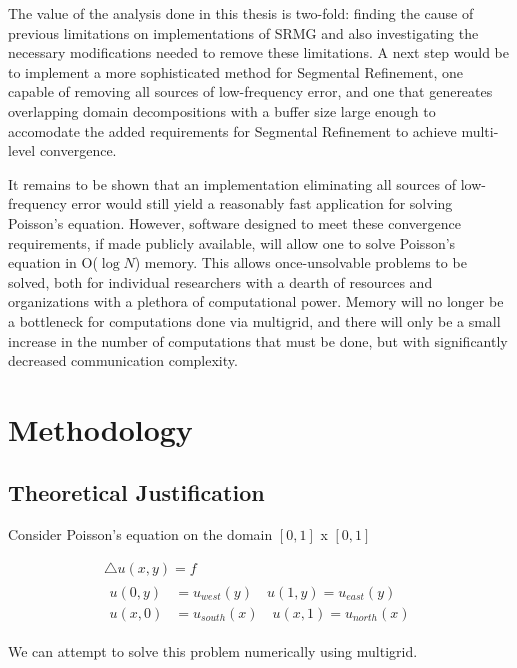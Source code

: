 \documentclass[final]{siamart1116}
\numberwithin{theorem}{section}
\begin{document}
    
    The value of the analysis done in this thesis is two-fold: finding the cause of previous limitations on implementations of SRMG and also investigating the necessary modifications needed to remove these limitations. A next step would be to implement a more sophisticated method for Segmental Refinement, one capable of removing all sources of low-frequency error, and one that genereates overlapping domain decompositions with a buffer size large enough to accomodate the added requirements for Segmental Refinement to achieve multi-level convergence.  
    
    It remains to be shown that an implementation eliminating all sources of low-frequency error would still yield a reasonably fast application for solving Poisson's equation. However, software designed to meet these convergence requirements, if made publicly available, will allow one to solve Poisson's equation in O($\log{N}$) memory.  This allows once-unsolvable problems to be solved, both for individual researchers with a dearth of resources and organizations with a plethora of computational power. Memory will no longer be a bottleneck for computations done via multigrid, and there will only be a small increase in the number of computations that must be done, but with significantly decreased communication complexity.
   

\section{Methodology}\label{sec:method}
\subsection{Theoretical Justification}
Consider Poisson's equation on the domain $[0, 1]$ x $[0, 1]$

\begin{gather}
  \bigtriangleup  u(x,y) = f \label{eq:Poisson} \\
  \begin{split}
    u(0,y) &= u_{west}(y) \quad u(1,y) = u_{east}(y) \label{boundary} \\
    u(x,0) &= u_{south}(x) \quad u(x,1) = u_{north}(x) \nonumber
  \end{split}
\end{gather}


We can attempt to solve this problem numerically using multigrid. 
\end{document}
